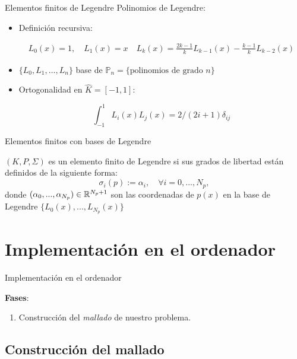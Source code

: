 \documentclass[9pt,leqno]{beamer}
\newcommand{\Np}{{N_p}}
\newcommand{\refelem}{\widehat}
\begin{document}
\begin{frame}{Elementos finitos de Legendre}
  Polinomios de Legendre:
  \begin{itemize}
  \item Definición recursiva:
    \begin{footnotesize}
      \begin{align*}
        L_0(x)=1, \quad L_1(x)=x \quad L_{k}(x) = \frac{2k-1}k L_{k-1}(x) - \frac{k-1}{k} L_{k-2}(x)
      \end{align*}
    \end{footnotesize}
  \item $\{L_0,L_1,\dots,L_n\}$ base de $\mathbb{P}_n=\{\text{polinomios de grado } n\}$
  \item Ortogonalidad en $\refelem K=[-1,1]$:
    \begin{footnotesize}
      $$\int_{-1}^1 L_i(x) L_j(x) = 2/(2i+1)\delta_{ij}$$
    \end{footnotesize}
  \end{itemize}

  Elementos finitos con bases de Legendre
  \begin{definition} $(K,P,\Sigma)$ es un \alert{elemento finito de
      Legendre} si sus grados de libertad están definidos de la
    siguiente forma:
    $$
    \sigma_i(p) := \alpha_i, \quad \forall i=0,...,\Np,
    $$
    donde $(\alpha_0,...,\alpha_\Np) \in\Rset^{\Np+1}$ son las coordenadas
    de $p(x)$ en la base de Legendre $\{L_0(x),...,L_\Np(x)\}$
  \end{definition}

\end{frame}

\section{Implementación en el ordenador}

\begin{frame}{Implementación en el ordenador}
	
	{\large \textbf{Fases}}:
	\bigskip
	\begin{enumerate}\itemsep1em
		\item Construcción del \alert{\textit{mallado}} de nuestro problema.
	\end{enumerate}
\end{frame}

\subsection{Construcción del mallado}


{}
\end{document}
